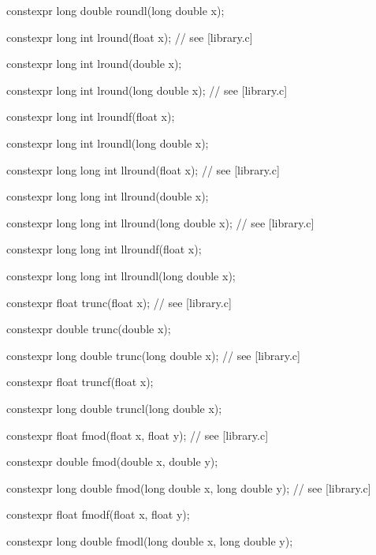 \documentclass[prd,twocolumn,amsmath,amssymb,nofootinbib,eqsecnum]{revtex4-1}
\newcommand{\highlight}[1]{{\color{red} #1}}
\begin{document}
\begin{widetext}
{\highlight{constexpr} long double roundl(long double x);

\vspace{2ex}

\highlight{constexpr} long int lround(float x); // see [library.c]

\highlight{constexpr} long int lround(double x);

\highlight{constexpr} long int lround(long double x); // see [library.c]

\highlight{constexpr} long int lroundf(float x);

\highlight{constexpr} long int lroundl(long double x);

\vspace{2ex}

\highlight{constexpr} long long int llround(float x); // see [library.c]

\highlight{constexpr} long long int llround(double x);

\highlight{constexpr} long long int llround(long double x); // see [library.c]

\highlight{constexpr} long long int llroundf(float x);

\highlight{constexpr} long long int llroundl(long double x);

\vspace{2ex}

\highlight{constexpr} float trunc(float x); // see [library.c]

\highlight{constexpr} double trunc(double x);

\highlight{constexpr} long double trunc(long double x); // see [library.c]

\highlight{constexpr} float truncf(float x);

\highlight{constexpr} long double truncl(long double x);

\vspace{2ex}

\highlight{constexpr} float fmod(float x, float y); // see [library.c]

\highlight{constexpr} double fmod(double x, double y);

\highlight{constexpr} long double fmod(long double x, long double y); // see [library.c]

\highlight{constexpr} float fmodf(float x, float y);

\highlight{constexpr} long double fmodl(long double x, long double y);

\vspace{2ex}

}
\end{widetext}
\end{document}
